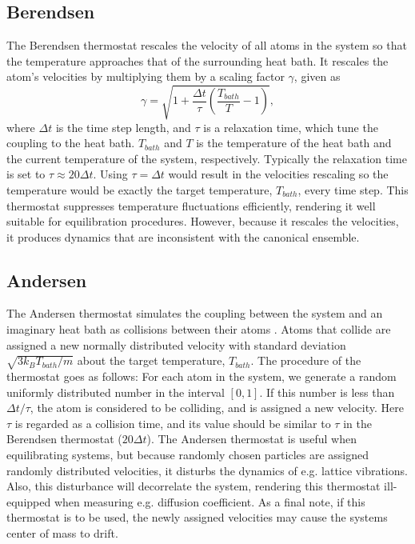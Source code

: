 \documentclass[twoside,english]{uiofysmaster}
\newcommand\lr[1]{\left(#1\right)}
\begin{document}
\subsection{Berendsen}
The Berendsen thermostat rescales the velocity of all atoms in the system so that the temperature approaches that of the surrounding heat bath.
It rescales the atom's velocities by multiplying them by a scaling factor $\gamma$, given as 
\begin{equation}
\gamma = \sqrt{1+\frac{\Delta t}{\tau}\lr{\frac{T_{bath}}{T}-1}},
\end{equation}
where $\Delta t$ is the time step length, and $\tau$ is a relaxation time, which tune the coupling to the heat bath. 
$T_{bath}$ and $T$ is the temperature of the heat bath and the current temperature of the system, respectively.
Typically the relaxation time is set to $\tau \approx 20\Delta t$. 
Using $\tau = \Delta t$ would result in the velocities rescaling so the temperature would be exactly the target temperature, $T_{bath}$, every time step. 
This thermostat suppresses temperature fluctuations efficiently, rendering it well suitable for equilibration procedures.
However, because it rescales the velocities, it produces dynamics that are inconsistent with the canonical ensemble.



\subsection{Andersen}
The Andersen thermostat simulates the coupling between the system and an imaginary heat bath as collisions between their atoms \cite{thermostat}. 
Atoms that collide are assigned a new normally distributed velocity with standard deviation  $\sqrt{3k_BT_{bath}/m}$ about the target temperature, $T_{bath}$.
The procedure of the thermostat goes as follows:
For each atom in the system, we generate a random uniformly distributed number in the interval $[0,1]$. 
If this number is less than $\Delta t/\tau$, the atom is considered to be colliding, and is assigned a new velocity. 
Here $\tau$ is regarded as a collision time, and its value should be similar to $\tau$ in the Berendsen thermostat ($20\Delta t$). 
The Andersen thermostat is useful when equilibrating systems, but because randomly chosen particles are assigned randomly distributed velocities, it disturbs the dynamics of e.g. lattice vibrations. 
Also, this disturbance will decorrelate the system, rendering this thermostat ill-equipped when measuring e.g. diffusion coefficient.  
As a final note, if this thermostat is to be used, the newly assigned velocities may cause the systems center of mass to drift.
\end{document}
